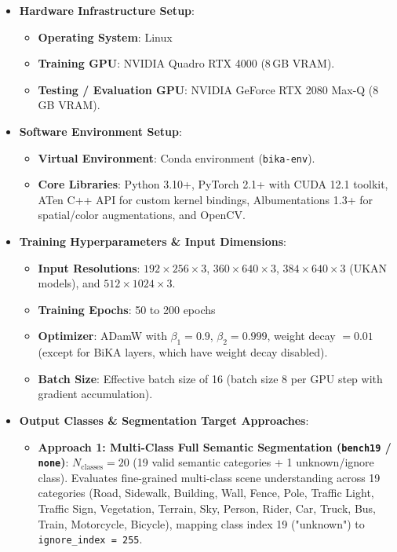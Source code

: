 \documentclass[a4paper]{report}
\begin{document}
\begin{itemize}
    \item \textbf{Hardware Infrastructure Setup}:
    \begin{itemize}
        \item \textbf{Operating System}: Linux
        \item \textbf{Training GPU}: NVIDIA Quadro RTX 4000 (8\,GB VRAM).
        \item \textbf{Testing / Evaluation GPU}: NVIDIA GeForce RTX 2080 Max-Q (8\,GB VRAM).
    \end{itemize}
    
    \item \textbf{Software Environment Setup}:
    \begin{itemize}
        \item \textbf{Virtual Environment}: Conda environment (\texttt{bika-env}).
        \item \textbf{Core Libraries}: Python 3.10+, PyTorch 2.1+ with CUDA 12.1 toolkit, ATen C++ API for custom kernel bindings, Albumentations 1.3+ for spatial/color augmentations, and OpenCV.
    \end{itemize}
    
    \item \textbf{Training Hyperparameters \& Input Dimensions}:
    \begin{itemize}
        \item \textbf{Input Resolutions}: $192 \times 256 \times 3$,  $360 \times 640 \times 3$, $384 \times 640 \times 3$ (UKAN models), and $512 \times 1024 \times 3$.
        \item \textbf{Training Epochs}: 50 to 200 epochs 
        \item \textbf{Optimizer}: ADamW with $\beta_1 = 0.9$, $\beta_2 = 0.999$, weight decay $= 0.01$ (except for BiKA layers, which have weight decay disabled).
        \item \textbf{Batch Size}: Effective batch size of 16 (batch size 8 per GPU step with gradient accumulation).
    \end{itemize}
    
    \item \textbf{Output Classes \& Segmentation Target Approaches}:
    \begin{itemize}
        \item \textbf{Approach 1: Multi-Class Full Semantic Segmentation (\texttt{bench19} / \texttt{none})}:
        $N_{\text{classes}} = 20$ (19 valid semantic categories + 1 unknown/ignore class). Evaluates fine-grained multi-class scene understanding across 19 categories (Road, Sidewalk, Building, Wall, Fence, Pole, Traffic Light, Traffic Sign, Vegetation, Terrain, Sky, Person, Rider, Car, Truck, Bus, Train, Motorcycle, Bicycle), mapping class index 19 ("unknown") to \texttt{ignore\_index = 255}.
        

\end{itemize}
\end{itemize}
\end{document}
